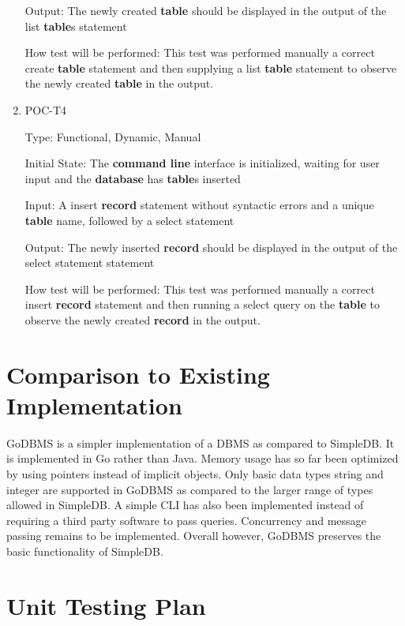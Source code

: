 \documentclass[12pt, titlepage]{article}
\begin{document}
\begin{enumerate}
Output: The newly created \textbf{table} should be displayed in the output of the list \textbf{table}s statement
					
How test will be performed: This test was performed manually a correct create \textbf{table} statement and then supplying a list \textbf{table} statement to observe the newly created \textbf{table} in the output.

\item{POC-T4\\}

Type: Functional, Dynamic, Manual
					
Initial State: The \textbf{command line} interface is initialized, waiting for user input and the \textbf{database} has \textbf{table}s inserted
					
Input: A insert \textbf{record} statement without syntactic errors and a unique \textbf{table} name, followed by a select statement
					
Output: The newly inserted \textbf{record} should be displayed in the output of the select statement statement
					
How test will be performed: This test was performed manually a correct insert \textbf{record} statement and then running a select query on the \textbf{table} to observe the newly created \textbf{record} in the output. 

\end{enumerate}
	
\section{Comparison to Existing Implementation}	
GoDBMS is a simpler implementation of a DBMS as compared to SimpleDB. It is implemented in Go rather than Java. Memory usage has so far been optimized by using pointers instead of implicit objects. Only basic data types string and integer are supported in GoDBMS as compared to the larger range of types allowed in SimpleDB. A simple CLI has also been implemented instead of requiring a third party software to pass queries. Concurrency and message passing remains to be implemented. Overall however, GoDBMS preserves the basic functionality of SimpleDB.
				
\section{Unit Testing Plan}

		
\end{document}
